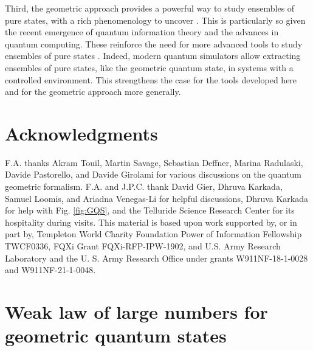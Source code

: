 \documentclass[draft,nofootinbib,pre,twocolumn,showkeys,superscriptaddress,preprintnumbers,floatfix]{revtex4-1}
\newcommand{\1}{\mathbbm{1}}
\begin{document}
Third, the geometric approach provides a powerful way to study ensembles of
pure states, with a rich phenomenology to uncover
\cite{Zyck11,Vivo16,Shang15b,Shang15a,Luo11}. This is particularly so given the
recent emergence of quantum information theory and the advances in quantum
computing. These reinforce the need for more advanced tools to study ensembles
of pure states \cite{Cot21,Choi21,WeiHo22}. Indeed, modern quantum simulators
allow extracting ensembles of pure states, like the geometric quantum state, in
systems with a controlled environment. This strengthens the case for the tools
developed here and for the geometric approach more generally.

\section*{Acknowledgments}
\label{sec:acknowledgments}

F.A. thanks Akram Touil, Martin Savage, Sebastian Deffner, Marina Radulaski, Davide
Pastorello, and Davide Girolami for various discussions on the quantum geometric 
formalism. F.A. and J.P.C. thank David Gier, Dhruva Karkada, Samuel
Loomis, and Ariadna Venegas-Li for helpful discussions, Dhruva Karkada for help
with Fig. \ref{fig:GQS}, and the Telluride Science Research Center for its
hospitality during visits. This material is based upon work supported by, or in
part by, Templeton World Charity Foundation Power of Information Fellowship
TWCF0336, FQXi Grant FQXi-RFP-IPW-1902, and U.S. Army Research Laboratory and
the U. S. Army Research Office under grants W911NF-18-1-0028 and
W911NF-21-1-0048.

% 
%
\appendix
%
%


\section{Weak law of large numbers for geometric quantum states}
\label{app:QuantumWeakLaw}
\end{document}

